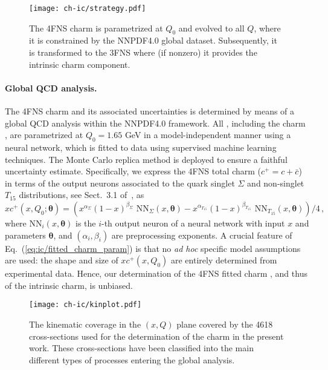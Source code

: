 \begin{figure}[h]
\begin{center}
  \texttt{[image: ch-ic/strategy.pdf]}
 \end{center}
\vspace{-0.2cm}
\caption{The 4FNS charm \pdf is parametrized  at $Q_0$
  and evolved to all  $Q$, where it is  constrained by the NNPDF4.0
  global dataset. 
 Subsequently, it is transformed to the 3FNS where (if nonzero) it
 provides the intrinsic charm component.
  \label{fig:ic/strategy}
}
\end{figure}

\paragraph{Global QCD analysis.}
%
The 4FNS charm \pdf and its associated
uncertainties is determined by means of a global QCD analysis
within the NNPDF4.0 framework.
%
All \pdfs, including the charm \pdf, are  parametrized at $Q_0=1.65$ GeV in 
a model-independent manner using a neural network, which is fitted to data using 
supervised machine learning techniques.
The Monte Carlo replica method
is deployed to ensure a faithful uncertainty estimate.
%
Specifically, we express the 4FNS total charm \pdf ($c^+=c+\bar{c}$)  in terms of the output neurons associated to the quark singlet $\Sigma$ and non-singlet $T_{15}$
distributions, see Sect.~3.1 of~\cite{Ball:2021leu}, as
\begin{equation}
\label{eq:ic/fitted_charm_param}
xc^+(x,Q_0;{\boldsymbol \theta}) =
\left( x^{\alpha_{\Sigma}}(1-x)^{\beta_{\Sigma}} \textrm{ NN}_{\Sigma}(x,{\boldsymbol \theta})-
x^{\alpha_{T_{15}}}(1-x)^{\beta_{T_{15}}} \textrm{ NN}_{T_{15}}(x,{\boldsymbol \theta})
\right)/4 \, ,
\end{equation}
where $\textrm{NN}_{i}(x,{\boldsymbol \theta})$ is the $i$-th output neuron of
a neural network with input $x$ and  parameters ${\boldsymbol \theta}$, and 
$\left(\alpha_i,\beta_i\right)$ are preprocessing exponents.
%
A crucial feature of Eq.~(\ref{eq:ic/fitted_charm_param}) is that no \textit{
ad hoc} specific model assumptions are used: the shape and size of
$xc^+(x,Q_0)$ are entirely determined from experimental data.
%
Hence, our determination of the 4FNS fitted charm \pdf, and thus of the intrinsic charm, is unbiased.
%

\begin{figure}[t]
\begin{center}
  \texttt{[image: ch-ic/kinplot.pdf]}
 \end{center}
\vspace{-0.8cm}
\caption{The kinematic coverage in the $(x,Q)$ plane
  covered by the 4618 cross-sections used for the
  determination of the charm \pdf in the present work.
  These cross-sections have been classified into the main different
  types of processes entering the global analysis.
  \label{fig:ic/kinplot}
}
\end{figure}

